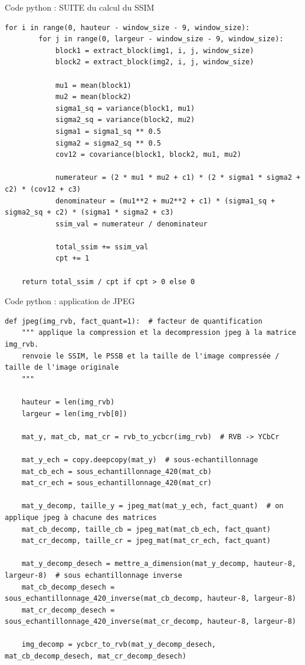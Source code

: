 \documentclass[xcolor=dvipsnames]{beamer}
\begin{document}
\begin{frame}[fragile]{Code python : SUITE du calcul du SSIM}
    \begin{lstlisting}[style=pythonStyle]
    for i in range(0, hauteur - window_size - 9, window_size):
        for j in range(0, largeur - window_size - 9, window_size):
            block1 = extract_block(img1, i, j, window_size)
            block2 = extract_block(img2, i, j, window_size)

            mu1 = mean(block1)
            mu2 = mean(block2)
            sigma1_sq = variance(block1, mu1)
            sigma2_sq = variance(block2, mu2)
            sigma1 = sigma1_sq ** 0.5
            sigma2 = sigma2_sq ** 0.5
            cov12 = covariance(block1, block2, mu1, mu2)

            numerateur = (2 * mu1 * mu2 + c1) * (2 * sigma1 * sigma2 + c2) * (cov12 + c3)
            denominateur = (mu1**2 + mu2**2 + c1) * (sigma1_sq + sigma2_sq + c2) * (sigma1 * sigma2 + c3)
            ssim_val = numerateur / denominateur

            total_ssim += ssim_val
            cpt += 1

    return total_ssim / cpt if cpt > 0 else 0

    \end{lstlisting}
\end{frame}

\begin{frame}[fragile]{Code python : application de JPEG}
    \begin{lstlisting}[style=pythonStyle]
def jpeg(img_rvb, fact_quant=1):  # facteur de quantification
    """ applique la compression et la decompression jpeg à la matrice img_rvb.
    renvoie le SSIM, le PSSB et la taille de l'image compressée / taille de l'image originale
    """

    hauteur = len(img_rvb)
    largeur = len(img_rvb[0])

    mat_y, mat_cb, mat_cr = rvb_to_ycbcr(img_rvb)  # RVB -> YCbCr
    
    mat_y_ech = copy.deepcopy(mat_y)  # sous-echantillonnage
    mat_cb_ech = sous_echantillonnage_420(mat_cb)
    mat_cr_ech = sous_echantillonnage_420(mat_cr)
    
    mat_y_decomp, taille_y = jpeg_mat(mat_y_ech, fact_quant)  # on applique jpeg à chacune des matrices
    mat_cb_decomp, taille_cb = jpeg_mat(mat_cb_ech, fact_quant)
    mat_cr_decomp, taille_cr = jpeg_mat(mat_cr_ech, fact_quant)

    mat_y_decomp_desech = mettre_a_dimension(mat_y_decomp, hauteur-8, largeur-8)  # sous echantillonnage inverse
    mat_cb_decomp_desech = sous_echantillonnage_420_inverse(mat_cb_decomp, hauteur-8, largeur-8)
    mat_cr_decomp_desech = sous_echantillonnage_420_inverse(mat_cr_decomp, hauteur-8, largeur-8)

    img_decomp = ycbcr_to_rvb(mat_y_decomp_desech, mat_cb_decomp_desech, mat_cr_decomp_desech)

    \end{lstlisting}
\end{frame}
\end{document}
